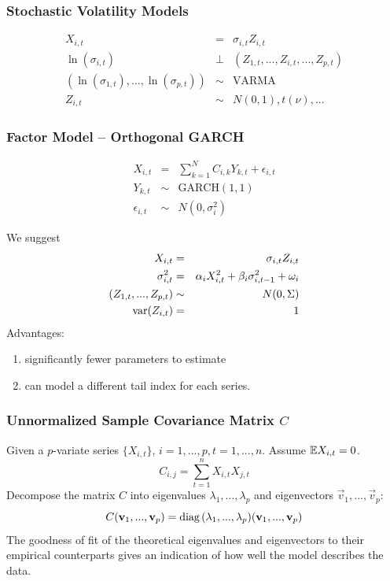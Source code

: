 \documentclass{beamer}
\begin{document}
\begin{frame}
  \frametitle{Stochastic Volatility Models}
  \begin{eqnarray*}
    X_{i,t} &=& \sigma_{i, t} Z_{i, t} \\
    \ln(\sigma_{i,t}) &\bot& (Z_{1, t}, ..., Z_{i, t}, ..., Z_{p,t}) \\
    (\ln(\sigma_{1,t}), \dots, \ln(\sigma_{p,t})) &\sim& \text{VARMA}
    \\
    Z_{i,t} &\sim& N(0,1), t(\nu), ...
  \end{eqnarray*}
\end{frame}

\begin{frame}
  \frametitle{Factor Model -- Orthogonal GARCH}
  \begin{eqnarray*}
    X_{i, t} &=& \sum_{k=1}^N C_{i,k} Y_{k, t} + \epsilon_{i, t} \\
    Y_{k, t} &\sim& \text{GARCH}(1,1) \\
    \epsilon_{i,t} &\sim& N(0, \sigma_i^2)
  \end{eqnarray*}
\end{frame}

\begin{frame}
  We suggest
  \begin{eqnarray*}
    X_{i, t} &=& \sigma_{i, t} Z_{i, t} \\
    \sigma_{i, t}^2 &=& \alpha_{i} X_{i, t}^2 + \beta_{i} \sigma_{i, t-1}^2 + \omega_i \\
    (Z_{1, t}, ..., Z_{p, t}) &\sim& N(0, \Sigma) \\
    \text{var}(Z_{i,t}) &=& 1
  \end{eqnarray*}
  Advantages:
  \begin{enumerate}
  \item significantly fewer parameters to estimate
  \item can model a different tail index for each series.
  \end{enumerate}
\end{frame}

\begin{frame}
  \frametitle{Unnormalized Sample Covariance Matrix $C$}
  Given a $p$-variate series $\{X_{i, t}\}$, $i=1,...,p, t=1,...,n$.
  Assume $\mathbb{E} X_{i, t} = 0$.
  \[
  C_{i, j} = \sum_{t=1}^n X_{i,t} X_{j,t}
  \]
  Decompose the matrix $C$ into eigenvalues $\lambda_1, ...,
  \lambda_p$ and eigenvectors $\vec v_1, ..., \vec v_p$:
  \[
  C (\mathbf{v}_1, ..., \mathbf{v}_p) = \text{diag\,}(\lambda_1, ..., \lambda_p) (\mathbf{v}_1, ..., \mathbf{v}_p)
  \]
  The goodness of fit of the theoretical eigenvalues and eigenvectors
  to their empirical counterparts gives an indication of how well the
  model describes the data.
\end{frame}
\end{document}
